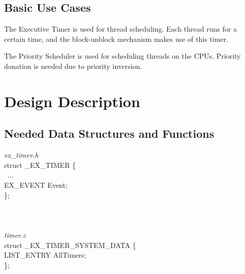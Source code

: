 \documentclass{report}
\begin{document}
\subsection{Basic Use Cases}
	\item The Executive Timer is used for thread scheduling. Each thread runs for a certain time, and the block-unblock mechanism 
		  makes use of this timer.
	\item The Priority Scheduler is used for scheduling threads on the CPUs. Priority donation is needed due to priority inversion.


\section{Design Description}

\subsection{Needed Data Structures and Functions}

	\textit{ex\_timer.h} \\
	struct \_EX\_TIMER \{ \\\
	    ... \\
	    EX\_EVENT Event; \\
	\};\\
\\
\\
\\
	\textit{timer.c} \\
	struct \_EX\_TIMER\_SYSTEM\_DATA \{\\
		LIST\_ENTRY AllTimers;\\
	\};
\end{document}
